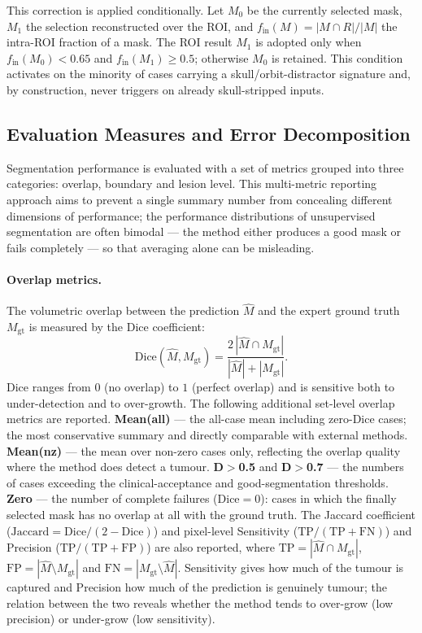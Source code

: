 \documentclass[11pt,a4paper]{article}
\begin{document}
This correction is applied conditionally. Let $M_0$ be the currently selected
mask, $M_1$ the selection reconstructed over the ROI, and
$f_{\text{in}}(M)=|M\cap R|/|M|$ the intra-ROI fraction of a mask. The ROI result
$M_1$ is adopted only when $f_{\text{in}}(M_0) < 0.65$ and
$f_{\text{in}}(M_1) \ge 0.5$; otherwise $M_0$ is retained. This condition
activates on the minority of cases carrying a skull/orbit-distractor signature and,
by construction, never triggers on already skull-stripped inputs.

\subsection{Evaluation Measures and Error Decomposition}\label{sec:eval}

Segmentation performance is evaluated with a set of metrics grouped into three
categories: overlap, boundary and lesion level. This multi-metric reporting
approach aims to prevent a single summary number from concealing different
dimensions of performance; the performance distributions of unsupervised
segmentation are often bimodal --- the method either produces a good mask or fails
completely --- so that averaging alone can be misleading.

\paragraph{Overlap metrics.} The volumetric overlap between the prediction
$\hat M$ and the expert ground truth $M_{\mathrm{gt}}$ is measured by the Dice
coefficient:
\begin{equation}
\text{Dice}(\hat M,M_{\mathrm{gt}})=\frac{2\,|\hat M\cap M_{\mathrm{gt}}|}{|\hat M|+|M_{\mathrm{gt}}|}.
\label{eq:dice}
\end{equation}
Dice ranges from $0$ (no overlap) to $1$ (perfect overlap) and is sensitive both to
under-detection and to over-growth. The following additional set-level overlap
metrics are reported. \textbf{Mean(all)} --- the all-case mean including zero-Dice
cases; the most conservative summary and directly comparable with external
methods. \textbf{Mean(nz)} --- the mean over non-zero cases only, reflecting the
overlap quality where the method does detect a tumour. \textbf{D$>$0.5} and
\textbf{D$>$0.7} --- the numbers of cases exceeding the clinical-acceptance and
good-segmentation thresholds. \textbf{Zero} --- the number of complete failures
(Dice$=0$): cases in which the finally selected mask has no overlap at all with
the ground truth. The Jaccard coefficient
($\mathrm{Jaccard}=\mathrm{Dice}/(2-\mathrm{Dice})$) and pixel-level Sensitivity
($\mathrm{TP}/(\mathrm{TP}+\mathrm{FN})$) and Precision
($\mathrm{TP}/(\mathrm{TP}+\mathrm{FP})$) are also reported, where
$\mathrm{TP}=|\hat M\cap M_{\mathrm{gt}}|$,
$\mathrm{FP}=|\hat M\setminus M_{\mathrm{gt}}|$ and
$\mathrm{FN}=|M_{\mathrm{gt}}\setminus \hat M|$. Sensitivity gives how much of the
tumour is captured and Precision how much of the prediction is genuinely tumour;
the relation between the two reveals whether the method tends to over-grow (low
precision) or under-grow (low sensitivity).
\end{document}
